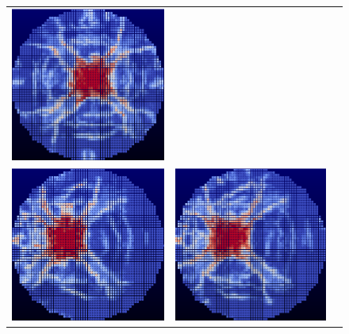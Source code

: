 \begin{figure}
\begin{tabular}{ccc}
  \includegraphics[scale=0.75]{true_soln_1512.eps} \\
  \includegraphics[scale=0.75]{true_soln_19049.eps} &
  \includegraphics[scale=0.75]{true_soln_19050.eps} &

\end{tabular}
\end{figure}
